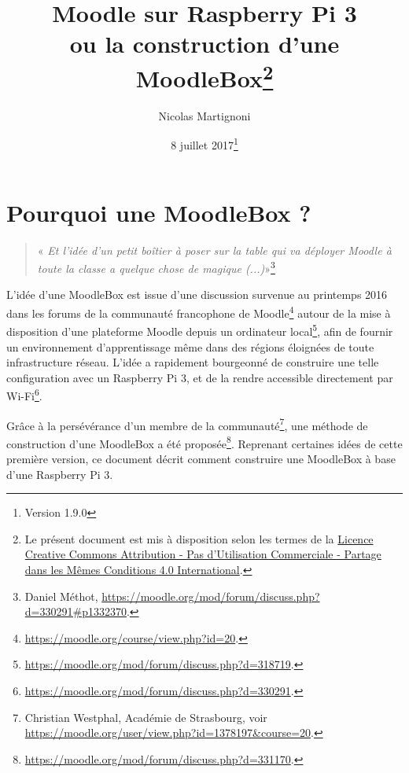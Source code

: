 \documentclass[11pt]{article}
\begin{document}
\title{Moodle sur Raspberry Pi 3\\ ou la construction d'une MoodleBox\footnote{Le présent document est mis à disposition selon les termes de la \href{http://creativecommons.org/licenses/by-nc-sa/4.0/}{Licence Creative Commons Attribution - Pas d'Utilisation Commerciale - Partage dans les Mêmes Conditions 4.0 International}.}}
\date{8 juillet 2017\footnote{Version 1.9.0}} %
\author{Nicolas Martignoni}
\maketitle

\begingroup
\setlength{\parskip}{0pt}
\tableofcontents
\endgroup

\section{Pourquoi une MoodleBox ?}

\begin{quote}
\noindent « \emph{Et l'idée d'un petit boîtier à poser sur la table qui va déployer Moodle à toute la classe a quelque chose de magique (...)}»\footnote{Daniel Méthot, \url{https://moodle.org/mod/forum/discuss.php?d=330291\#p1332370}.}
\end{quote}

L'idée d'une MoodleBox est issue d'une discussion survenue au printemps 2016 dans les forums de la communauté francophone de Moodle\footnote{\url{https://moodle.org/course/view.php?id=20}.} autour de la mise à disposition d'une plateforme Moodle depuis un ordinateur local\footnote{\url{https://moodle.org/mod/forum/discuss.php?d=318719}.}, afin de fournir un environnement d'apprentissage même dans des régions éloignées de toute infrastructure réseau. L'idée a rapidement bourgeonné de construire une telle configuration avec un Raspberry Pi 3, et de la rendre accessible directement par Wi-Fi\footnote{\url{https://moodle.org/mod/forum/discuss.php?d=330291}.}.

Grâce à la persévérance d'un membre de la communauté\footnote{Christian Westphal, Académie de Strasbourg, voir \url{https://moodle.org/user/view.php?id=1378197&course=20}.}, une méthode de construction d'une MoodleBox a été proposée\footnote{\url{https://moodle.org/mod/forum/discuss.php?d=331170}.}. Reprenant certaines idées de cette première version, ce document décrit comment construire une MoodleBox à base d'une Raspberry Pi 3.
\end{document}
